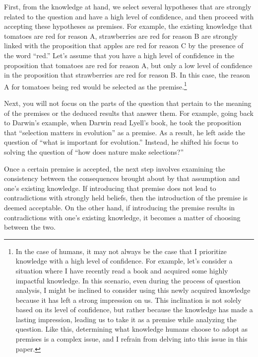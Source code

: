 \documentclass{article}
\begin{document}
First, from the knowledge at hand, we select several hypotheses that are strongly related to the question and have a high level of confidence, and then proceed with accepting these hypotheses as premises. For example, the existing knowledge that tomatoes are red for reason A, strawberries are red for reason B  are strongly linked with the proposition that apples are red for reason C by the presence of the word ``red.'' Let's assume that you have a high level of confidence in the proposition that tomatoes are red for reason A, but only a low level of confidence in the proposition that strawberries are red for reason B. In this case, the reason A for tomatoes being red would be selected as the premise.\footnote{
In the case of humans, it may not always be the case that I prioritize knowledge with a high level of confidence. For example, let's consider a situation where I have recently read a book and acquired some highly impactful knowledge. In this scenario, even during the process of question analysis, I might be inclined to consider using this newly acquired knowledge because it has left a strong impression on us. This inclination is not solely based on its level of confidence, but rather because the knowledge has made a lasting impression, leading us to take it as a premise while analyzing the question. Like this, determining what knowledge humans choose to adopt as premises is a complex issue, and I refrain from delving into this issue in this paper.
}

Next, you will not focus on the parts of the question that pertain to the meaning of the premises or the deduced results that answer them. For example, going back to Darwin's example, when Darwin read Lyell's book, he took the proposition that ``selection matters in evolution'' as a premise. As a result, he left aside the question of ``what is important for evolution.'' Instead, he shifted his focus to solving the question of ``how does nature make selections?''

Once a certain premise is accepted, the next step involves examining the consistency between the consequences brought about by that assumption and one's existing knowledge. If introducing that premise does not lead to contradictions with strongly held beliefs, then the introduction of the premise is deemed acceptable. On the other hand, if introducing the premise results in contradictions with one's existing knowledge, it becomes a matter of choosing between the two. 

\end{document}

